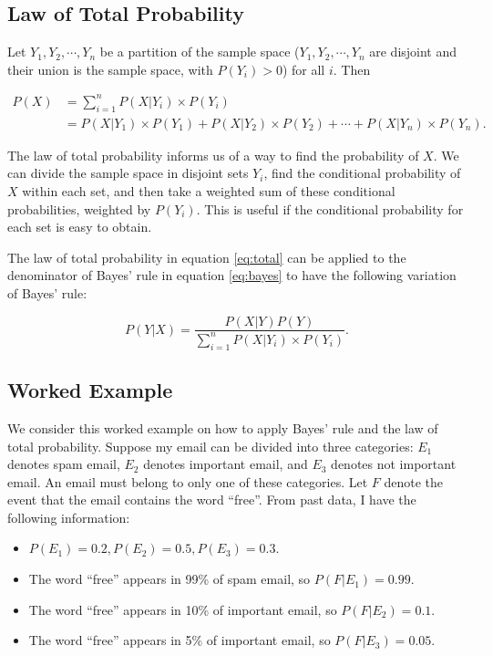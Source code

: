 \documentclass[
]{book}
\providecommand{\tightlist}{%
  \setlength{\itemsep}{0pt}\setlength{\parskip}{0pt}}
\begin{document}
\subsection{Law of Total Probability}\label{law-of-total-probability}

Let \(Y_1, Y_2, \cdots, Y_n\) be a partition of the sample space (\(Y_1, Y_2, \cdots, Y_n\) are disjoint and their union is the sample space, with \(P(Y_i) > 0\)) for all \(i\). Then

\begin{equation} 
\begin{split}
P(X) &= \sum_{i=1}^n P(X|Y_i) \times P(Y_i)\\
    &= P(X|Y_1) \times P(Y_1) + P(X|Y_2) \times P(Y_2) + \cdots + P(X|Y_n) \times P(Y_n).
\end{split}
\label{eq:total}
\end{equation}

The law of total probability informs us of a way to find the probability of \(X\). We can divide the sample space in disjoint sets \(Y_i\), find the conditional probability of \(X\) within each set, and then take a weighted sum of these conditional probabilities, weighted by \(P(Y_i)\). This is useful if the conditional probability for each set is easy to obtain.

The law of total probability in equation \eqref{eq:total} can be applied to the denominator of Bayes' rule in equation \eqref{eq:bayes} to have the following variation of Bayes' rule:

\begin{equation} 
P(Y|X) = \frac{P(X|Y)P(Y)}{\sum_{i=1}^n P(X|Y_i) \times P(Y_i)}.
\label{eq:bayes2}
\end{equation}

\subsection{Worked Example}\label{worked-example}

We consider this worked example on how to apply Bayes' rule and the law of total probability. Suppose my email can be divided into three categories: \(E_1\) denotes spam email, \(E_2\) denotes important email, and \(E_3\) denotes not important email. An email must belong to only one of these categories. Let \(F\) denote the event that the email contains the word ``free''. From past data, I have the following information:

\begin{itemize}
\tightlist
\item
  \(P(E_1) = 0.2, P(E_2) = 0.5, P(E_3) = 0.3\).
\item
  The word ``free'' appears in 99\% of spam email, so \(P(F|E_1) = 0.99\).
\item
  The word ``free'' appears in 10\% of important email, so \(P(F|E_2) = 0.1\).
\item
  The word ``free'' appears in 5\% of important email, so \(P(F|E_3) = 0.05\).
\end{itemize}
\end{document}
